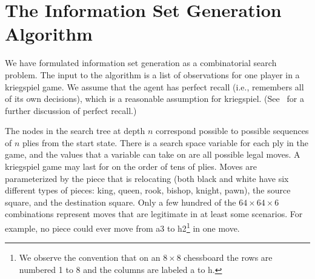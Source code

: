 \documentclass[11pt]{article}
\begin{document}

   
\section{The Information Set Generation Algorithm}
We have formulated information set generation as a combinatorial search problem.  The input to the algorithm is a list
of observations for one player in a kriegspiel game.  We assume that the agent has perfect recall (i.e., remembers all
of its own decisions), which is a reasonable assumption for kriegspiel.  (See~\cite{gilpin07algorithms} for a further
discussion of perfect recall.)  

The nodes in the search tree at depth $n$ correspond possible to possible sequences of $n$ plies from the start state.
There is a search space variable for each ply in the game, and the values that a variable can take on are all possible
legal moves.  A kriegspiel game may last for on the order of tens of plies.  Moves are parameterized by the piece that
is relocating (both black and white have six different types of pieces: king, queen, rook, bishop, knight, pawn), the
source square, and the destination square.  Only a few hundred of the $64 \times 64 \times 6$ combinations represent
moves that are legitimate in at least some scenarios.  For example, no piece could ever move from a3 to h2\footnote{We
observe the convention that on an $8 \times 8$ chessboard the rows are numbered 1 to 8 and the columns are labeled a to
h.} in one move.
\end{document}
